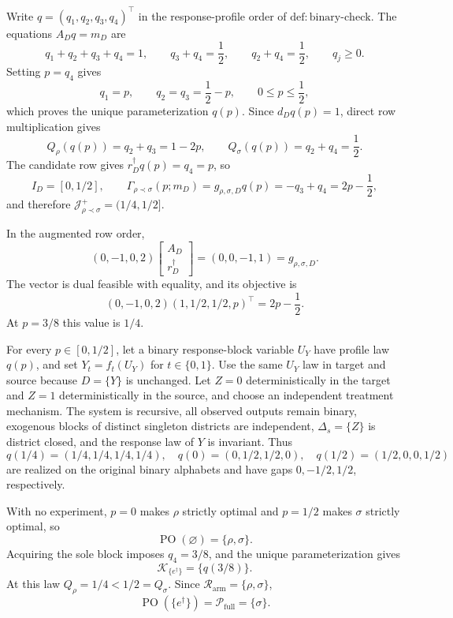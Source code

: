 Write \(q=(q_1,q_2,q_3,q_4)^\top\) in the response-profile order of \(\mathrm{def:binary\text{-}check}\). The equations \(A_Dq=m_D\) are
\[
q_1+q_2+q_3+q_4=1,
\qquad q_3+q_4=\frac12,
\qquad q_2+q_4=\frac12,
\qquad q_j\geq0.
\]
Setting \(p=q_4\) gives
\[
q_1=p,
\qquad q_2=q_3=\frac12-p,
\qquad 0\leq p\leq\frac12,
\]
which proves the unique parameterization \(q(p)\). Since \(d_Dq(p)=1\), direct row multiplication gives
\[
Q_\rho(q(p))=q_2+q_3=1-2p,
\qquad
Q_\sigma(q(p))=q_2+q_4=\frac12.
\]
The candidate row gives \(r_D^\dagger q(p)=q_4=p\), so
\[
I_D=[0,1/2],
\qquad
\Gamma_{\rho\prec\sigma}(p;m_D)
=g_{\rho,\sigma,D}q(p)=-q_3+q_4=2p-\frac12,
\]
and therefore \(\mathcal J_{\rho\prec\sigma}^+=(1/4,1/2]\).

In the augmented row order,
\[
(0,-1,0,2)
\begin{bmatrix}A_D\\ r_D^\dagger\end{bmatrix}
=(0,0,-1,1)=g_{\rho,\sigma,D}.
\]
The vector is dual feasible with equality, and its objective is
\[
(0,-1,0,2)(1,1/2,1/2,p)^\top=2p-\frac12.
\]
At \(p=3/8\) this value is \(1/4\).

For every \(p\in[0,1/2]\), let a binary response-block variable \(U_Y\) have profile law \(q(p)\), and set \(Y_t=f_t(U_Y)\) for \(t\in\{0,1\}\). Use the same \(U_Y\) law in target and source because \(D=\{Y\}\) is unchanged. Let \(Z=0\) deterministically in the target and \(Z=1\) deterministically in the source, and choose an independent treatment mechanism. The system is recursive, all observed outputs remain binary, exogenous blocks of distinct singleton districts are independent, \(\Delta_s=\{Z\}\) is district closed, and the response law of \(Y\) is invariant. Thus
\[
q(1/4)=(1/4,1/4,1/4,1/4),
\quad q(0)=(0,1/2,1/2,0),
\quad q(1/2)=(1/2,0,0,1/2)
\]
are realized on the original binary alphabets and have gaps \(0,-1/2,1/2\), respectively.

With no experiment, \(p=0\) makes \(\rho\) strictly optimal and \(p=1/2\) makes \(\sigma\) strictly optimal, so
\[
\operatorname{PO}(\varnothing)=\{\rho,\sigma\}.
\]
Acquiring the sole block imposes \(q_4=3/8\), and the unique parameterization gives
\[
\mathcal K_{\{e^\dagger\}}=\{q(3/8)\}.
\]
At this law \(Q_\rho=1/4<1/2=Q_\sigma\). Since \(\mathcal R_{\mathrm{arm}}=\{\rho,\sigma\}\),
\[
\operatorname{PO}(\{e^\dagger\})=\mathcal P_{\mathrm{full}}=\{\sigma\}.
\]